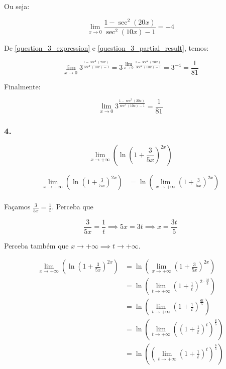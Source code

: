 \documentclass{article}
\begin{document}
Ou seja:

\begin{equation} \label{question_3_partial_result}
    \lim_{x \to 0} \frac{1 - \sec^2(20x) }{\sec^2(10x) - 1} = -4
\end{equation}

De \ref{question_3_expression} e \ref{question_3_partial_result}, temos:

\[
    \lim_{x \to 0} 3^{\frac{1 - \sec^2(20x) }{\sec^2(10x) - 1}}
    = 3^{\lim_{x \to 0} \frac{1 - \sec^2(20x) }{\sec^2(10x) - 1} }
        = 3^{-4}
    = \frac{1}{81}
\]

Finalmente:

\[
    \lim_{x \to 0} 3^{\frac{1 - \sec^2(20x) }{\sec^2(10x) - 1}} = \frac{1}{81}
\]




\subsubsection*{4.}

\[
    \lim_{x \to +\infty}\left(\ln\left(1 + \frac{3}{5x}\right)^{2x}\right)
\]

\begin{align*}
    \lim_{x \to +\infty}\left(\ln\left(1 + \frac{3}{5x}\right)^{2x}\right)
     & = \ln \left(\lim_{x \to +\infty}\left(1 + \frac{3}{5x}\right)^{2x}\right) \\
\end{align*}

Façamos \(\frac{3}{5x} = \frac{1}{t}\). Perceba que

\[
    \frac{3}{5x} = \frac{1}{t} \implies  5x = 3t \implies x = \frac{3t}{5}
\]

Perceba também que \(x \to +\infty \implies t \to +\infty\).

\begin{align*}
    \lim_{x \to +\infty}\left(\ln\left(1 + \frac{3}{5x}\right)^{2x}\right)
     & = \ln \left(\lim_{x \to +\infty}\left(1 + \frac{3}{5x}\right)^{2x}\right)                         \\
     & = \ln \left(\lim_{t \to +\infty}\left(1 + \frac{1}{t}\right)^{2\cdot\frac{3t}{5}}\right)          \\
     & = \ln \left(\lim_{t \to +\infty}\left(1 + \frac{1}{t}\right)^{\frac{6t}{5}}\right)                \\
     & = \ln \left(\lim_{t \to +\infty}\left(\left(1 + \frac{1}{t}\right)^t\right)^{\frac{6}{5}}\right)  \\
     & = \ln \left(\left(\lim_{t \to +\infty} \left(1 + \frac{1}{t}\right)^t\right)^{\frac{6}{5}}\right) \\
\end{align*}
\end{document}
